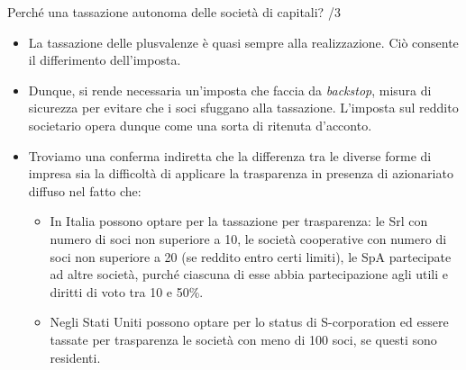 \documentclass[aspectratio=149,11pt,italian]{beamer}
\begin{document}
\begin{frame}{Perché una tassazione autonoma delle società di capitali? /3}
\begin{itemize}
\item La tassazione delle plusvalenze è quasi sempre alla realizzazione. Ciò
  consente il differimento dell'imposta.
\item Dunque, si rende necessaria un'imposta che faccia da \emph{backstop},
  misura di sicurezza per evitare che i soci sfuggano alla
  tassazione. L'imposta sul reddito societario opera dunque come una sorta di
  ritenuta d'acconto.
\end{itemize}
\bigskip

\begin{itemize}
\item Troviamo una conferma indiretta che la differenza tra le diverse forme
  di impresa sia la difficoltà di applicare la trasparenza in presenza di
  azionariato diffuso nel fatto che:
\begin{itemize}
\item In Italia possono optare per la tassazione per trasparenza: le Srl con
  numero di soci non superiore a 10, le società cooperative con numero di
  soci non superiore a 20 (se reddito entro certi limiti), le SpA partecipate
  ad altre società, purché ciascuna di esse abbia partecipazione agli utili e
  diritti di voto tra 10 e 50\%.
\item Negli Stati Uniti possono optare per lo status di S-corporation ed
  essere tassate per trasparenza le società con meno di 100 soci, se questi
  sono residenti.
\end{itemize}
\end{itemize}
\end{frame}
\end{document}
